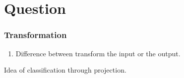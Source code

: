 \section{Question}

\begin{frame}
    \frametitle{Transformation}
    \begin{enumerate}
        \item Difference between transform the input or the output. 
    \end{enumerate}
    Idea of classification through projection. 
\end{frame}